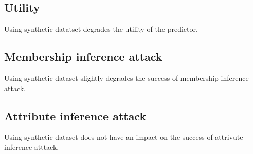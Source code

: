 \subsection{Utility}
Using synthetic datatset degrades the utility of the predictor.

\subsection{Membership inference attack}
Using synthetic dataset slightly degrades the success of membership inference attack.

\subsection{Attribute inference attack}
Using synthetic dataset does not have an impact on the success of attrivute inference atttack.
